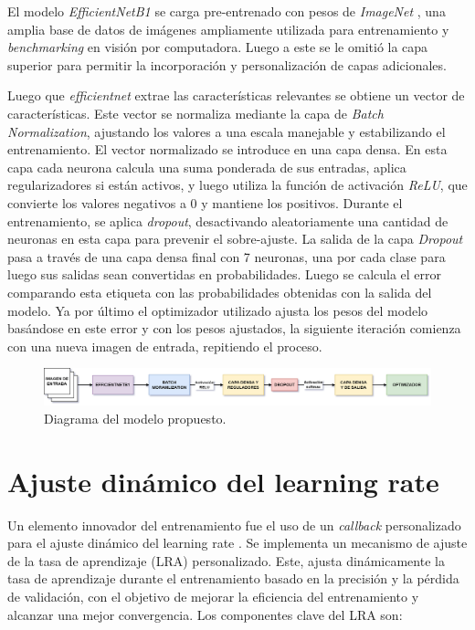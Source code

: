El modelo \textit{EfficientNetB1} se carga pre-entrenado con pesos de \textit{ImageNet} , una amplia base de datos de imágenes ampliamente utilizada para entrenamiento y \textit{benchmarking} en visión por computadora. Luego a este se le omitió la capa superior para permitir la incorporación y personalización de capas adicionales. 

Luego que \textit{efficientnet} extrae las características relevantes se obtiene un vector de características. Este vector se normaliza mediante la capa de \textit{Batch Normalization}, ajustando los valores a una escala manejable y estabilizando el entrenamiento. El vector normalizado se introduce en una capa densa. En esta capa cada neurona calcula una suma ponderada de sus entradas, aplica regularizadores si están activos, y luego utiliza la función de activación \textit{ReLU}, que convierte los valores negativos a 0 y mantiene los positivos. Durante el entrenamiento, se aplica \textit{dropout}, desactivando aleatoriamente una cantidad de neuronas en esta capa para prevenir el sobre-ajuste. La salida de  la capa \textit{Dropout} pasa a través de una capa densa final con 7 neuronas, una por cada clase para luego sus salidas sean convertidas en probabilidades. Luego se calcula el error comparando esta etiqueta con las probabilidades obtenidas con la salida del modelo. Ya por último el optimizador utilizado ajusta los pesos del modelo basándose en este error y con los pesos ajustados, la siguiente iteración comienza con una nueva imagen de entrada, repitiendo el proceso.

\begin{figure}[H]
   \begin{center}
   \includegraphics[width=1\textwidth]{./Graphics/diagrama_modelo.drawio.png}
   \caption{Diagrama del modelo propuesto.}
   \label{fig:model_permormance}
   \end{center}
   \end{figure}

\section{Ajuste dinámico del learning rate}

Un elemento innovador del entrenamiento fue el uso de un \textit{callback} personalizado para el ajuste dinámico del learning rate . Se implementa un mecanismo de ajuste de la tasa de aprendizaje (LRA) personalizado. Este, ajusta dinámicamente la tasa de aprendizaje durante el entrenamiento basado en la precisión y la pérdida de validación, con el objetivo de mejorar la eficiencia del entrenamiento y alcanzar una mejor convergencia. Los componentes clave del LRA son:

